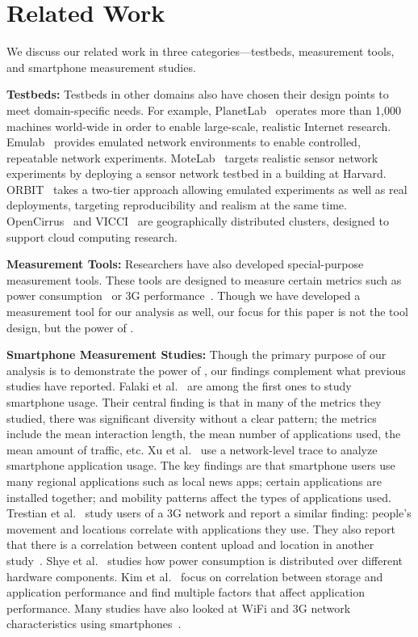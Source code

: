 \section{Related Work}
\label{sec:related}
We discuss our related work in three categories---testbeds, measurement tools,
and smartphone measurement studies.

{\bf Testbeds:} Testbeds in other domains also have chosen their design points
to meet domain-specific needs. For example, PlanetLab~\cite{peterson:ccr:2003,
planetlab} operates more than 1,000 machines world-wide in order to enable
large-scale, realistic Internet research. Emulab~\cite{white:osdi:2002, emulab}
provides emulated network environments to enable controlled, repeatable network
experiments. MoteLab~\cite{werner-allen:ipsn:2005} targets realistic sensor
network experiments by deploying a sensor network testbed in a building at
Harvard. ORBIT~\cite{raychaudhuri:tridentcom:2005} takes a two-tier approach
allowing emulated experiments as well as real deployments, targeting
reproducibility and realism at the same time.
OpenCirrus~\cite{avetisyan:computer:2010, opencirrus} and VICCI~\cite{vicci} are
geographically distributed clusters, designed to support cloud computing
research.

{\bf Measurement Tools:} Researchers have also developed special-purpose
measurement tools. These tools are designed to measure certain metrics such as
power consumption~\cite{zhang:codes:2010, pathak:eurosys:2012} or 3G
performance~\cite{huang:mobisys:2010}. Though we have developed a measurement
tool for our analysis as well, our focus for this paper is not the tool design,
but the power of \PhoneLab{}.

{\bf Smartphone Measurement Studies:}
Though the primary purpose of our analysis is to demonstrate the power of
\PhoneLab{}, our findings complement what previous studies have reported. Falaki
et al.~\cite{falaki:mobisys:2010} are among the first ones to study smartphone
usage. Their central finding is that in many of the metrics they studied, there
was significant diversity without a clear pattern; the metrics include the mean
interaction length, the mean number of applications used, the mean amount of
traffic, etc. Xu et al.~\cite{xu:imc:2011} use a network-level trace to analyze
smartphone application usage. The key findings are that smartphone users use
many regional applications such as local news apps; certain applications are
installed together; and mobility patterns affect the types of applications
used. Trestian et al.~\cite{trestian:imc:2009} study users of a 3G network and
report a similar finding: people's movement and locations correlate with
applications they use. They also report that there is a correlation between
content upload and location in another study~\cite{trestian:ton:2012}. Shye et
al.~\cite{shye:micro:2009} studies how power consumption is distributed over
different hardware components. Kim et al.~\cite{kim:fast:2012} focus on
correlation between storage and application performance and find multiple
factors that affect application performance. Many studies have also looked at
WiFi and 3G network characteristics using
smartphones~\cite{keralapura:mobicom:2010, maier:pam:2010, gember:pam:2011}.

